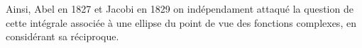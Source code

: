 Ainsi, Abel en 1827 et Jacobi en 1829 on indépendament attaqué la question de cette
intégrale associée à une ellipse du point de vue des fonctions complexes, en
considérant sa réciproque.














